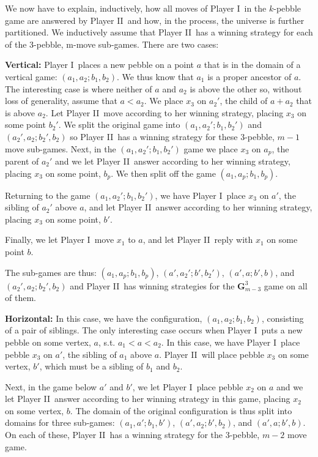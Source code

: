 \documentclass{LMCS}
\newcommand{\dupl}{Player II}
\newcommand{\spoiler}{Player I}
\newcommand{\G}{{\mathbf G}}
\theoremstyle{plain}
\theoremstyle{definition}
\begin{document}
We now have to explain, inductively, how all moves of \spoiler\ in the
$k$-pebble game are answered by \dupl\ and how, in the process, the
universe is further partitioned.  We inductively assume that \dupl\
has a winning strategy for each of the 3-pebble, m-move sub-games.
There are two cases:

{\bf Vertical:}  \spoiler\ places a new pebble on a point $a$ that is 
in the domain of a vertical game: $(a_1,a_2;b_1,b_2)$.  We thus know that $a_1$ is a proper
ancestor of $a$.  The interesting case is where
neither of $a$ and $a_2$ is above the other so, without loss of generality,
assume that $a<a_2$.  We place $x_3$ on $a_2'$, the child of $a+a_2$
  that is above $a_2$.  Let \dupl\
  move according to her winning strategy, placing $x_3$ on some point
  $b_2'$.  We split the
  original game into $(a_1,a_2';b_1,b_2')$ and  
$(a_2',a_2;b_2',b_2)$ 
so \dupl\ has a winning strategy for these 3-pebble, $m-1$
  move sub-games.  Next, in the  $(a_1,a_2';b_1,b_2')$ game we place
  $x_3$ on $a_p$, the parent of $a_2'$ and we let \dupl\ answer
  according to her winning strategy, placing $x_3$ on some point,
  $b_p$.  We then split off the game $(a_1,a_p;b_1,b_p)$.

Returning to the game $(a_1,a_2';b_1,b_2')$,  we have \spoiler\ place $x_3$ on $a'$,
the sibling of  $a_2'$ above $a$, and let \dupl\ answer according to her
winning strategy, placing $x_3$ on some point, $b'$.  

Finally, we let \spoiler\ move $x_1$ to $a$, and let \dupl\ reply with $x_1$
on some point $b$.  

The sub-games are thus:  $(a_1,a_p;b_1,b_p)$, $(a',a_2'; b', b_2')$,
$(a',a; b', b)$, and $(a_2',a_2;b_2',b_2)$ and \dupl\ has winning
strategies for the $\G^3_{m-3}$ game on all of them.  

{\bf Horizontal:}
In this case, we have the configuration, $(a_1,a_2;b_1,b_2)$,
consisting of a pair of siblings.  The only interesting case occurs
when \spoiler\ puts a new pebble on some vertex, $a$, s.t. $a_1 < a <
a_2$.  In this case, we have \spoiler\ place pebble $x_3$ on $a'$, the
sibling of $a_1$ above $a$.  \dupl\ will place pebble $x_3$ on some
vertex, $b'$, which must be a sibling of $b_1$ and $b_2$.  

Next, in the game below $a'$ and $b'$, we let \spoiler\ place pebble $x_2$
on $a$ and we let \dupl\ answer according to her winning strategy in
this game, placing $x_2$ on some vertex, $b$.  The domain of the
original configuration is thus split into domains for three sub-games:  
$(a_1,a';b_1,b')$,
$(a',a_2;b',b_2)$, and
$(a',a;b',b)$.  On each of these, \dupl\ has a winning strategy
for the 3-pebble, $m-2$ move game.  
\end{document}

